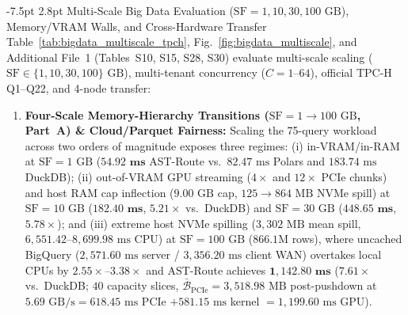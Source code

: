 \documentclass[10pt,a4paper]{article}
\makeatletter
\renewcommand\subsection{\@startsection{subsection}{2}{\z@}%
  {-7.5pt \@plus -2pt \@minus -1pt}%
  {2.8pt \@plus 1pt}%
  {\normalfont\normalsize\bfseries}}
\makeatother
\begin{document}
\subsection{Multi-Scale Big Data Evaluation ($\text{SF}=1, 10, 30, 100\text{ GB}$), Memory/VRAM Walls, and Cross-Hardware Transfer}
Table~\ref{tab:bigdata_multiscale_tpch}, Fig.~\ref{fig:bigdata_multiscale}, and Additional File~1 (Tables~S10, S15, S28, S30) evaluate multi-scale scaling ($\text{SF}\in\{1,10,30,100\}\text{ GB}$), multi-tenant concurrency ($C=1\text{--}64$), official TPC-H Q1--Q22, and 4-node transfer:
\begin{enumerate}[leftmargin=1.5em,itemsep=1pt]
    \item \textbf{Four-Scale Memory-Hierarchy Transitions ($\text{SF}=1\rightarrow 100\text{ GB}$, Part~A) \& Cloud/Parquet Fairness:} Scaling the 75-query workload across two orders of magnitude exposes three regimes: (i) in-VRAM/in-RAM at $\text{SF}=1\text{ GB}$ ($\mathbf{54.92\text{ ms}}$ AST-Route vs.\ $82.47\text{ ms}$ Polars and $183.74\text{ ms}$ DuckDB); (ii) out-of-VRAM GPU streaming ($4\times$ and $12\times$ PCIe chunks) and host RAM cap inflection ($9.00\text{ GB}$ cap, $125\rightarrow 864\text{ MB}$ NVMe spill) at $\text{SF}=10\text{ GB}$ ($\mathbf{182.40\text{ ms}}$, $5.21\times$ vs.\ DuckDB) and $\text{SF}=30\text{ GB}$ ($\mathbf{448.65\text{ ms}}$, $5.78\times$); and (iii) extreme host NVMe spilling ($3{,}302\text{ MB}$ mean spill, $6{,}551.42\text{--}8{,}699.98\text{ ms}$ CPU) at $\text{SF}=100\text{ GB}$ ($866.1\text{M}$ rows), where uncached BigQuery ($2{,}571.60\text{ ms}$ server / $3{,}356.20\text{ ms}$ client WAN) overtakes local CPUs by $2.55\times\text{--}3.38\times$ and AST-Route achieves $\mathbf{1{,}142.80\text{ ms}}$ ($7.61\times$ vs.\ DuckDB; $40$ capacity slices, $\bar{\mathcal{B}}_{\text{PCIe}}=3{,}518.98\text{ MB}$ post-pushdown at $5.69\text{ GB/s} = 618.45\text{ ms}$ PCIe $+ 581.15\text{ ms}$ kernel $= 1{,}199.60\text{ ms}$ GPU).

\end{enumerate}
\end{document}
